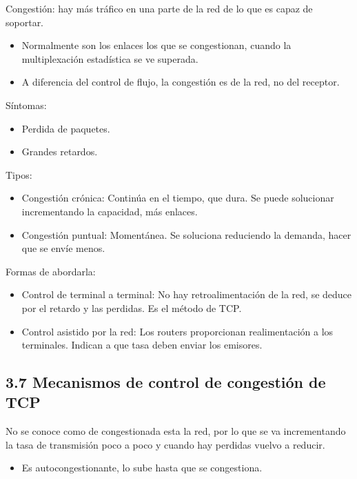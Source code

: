 \documentclass[12pt, twoside, openright]{report} %
\begin{document}
    Congestión: hay más tráfico en una parte de la red de lo que es
    capaz de soportar.

    \begin{itemize}
    \item
      Normalmente son los enlaces los que se congestionan, cuando la
      multiplexación estadística se ve superada.
    \item
      A diferencia del control de flujo, la congestión es de la red, no
      del receptor.
    \end{itemize}

	Síntomas:

    \begin{itemize}
    \item
      Perdida de paquetes.
    \item
      Grandes retardos.
    \end{itemize}

	Tipos:

    \begin{itemize}
    \item
      Congestión crónica: Continúa en el tiempo, que dura. Se puede
      solucionar incrementando la capacidad, más enlaces.
    \item
      Congestión puntual: Momentánea. Se soluciona reduciendo la
      demanda, hacer que se envíe menos.
    \end{itemize}

	Formas de abordarla:

    \begin{itemize}
    \item
      Control de terminal a terminal: No hay retroalimentación de la
      red, se deduce por el retardo y las perdidas. Es el método de TCP.
    \item
      Control asistido por la red: Los routers proporcionan
      realimentación a los terminales. Indican a que tasa deben enviar
      los emisores.
    \end{itemize}

\subsection{3.7 Mecanismos de control de congestión de TCP}


    No se conoce como de congestionada esta la red, por lo que se va
    incrementando la tasa de transmisión poco a poco y cuando hay
    perdidas vuelvo a reducir.

    \begin{itemize}
    \item
      Es autocongestionante, lo sube hasta que se congestiona.
    \end{itemize}
\end{document}
